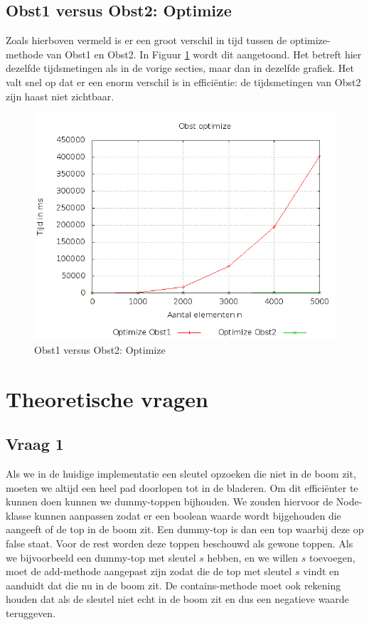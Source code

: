 \documentclass[titlepage,a4paper]{article}
\begin{document}
\subsection{Obst1 versus Obst2: Optimize}
Zoals hierboven vermeld is er een groot verschil in tijd tussen de optimize-methode van Obst1 en Obst2. In Figuur \ref{obst1_obst2_optimize} wordt dit aangetoond. Het betreft hier dezelfde tijdsmetingen als in de vorige secties, maar dan in dezelfde grafiek. Het valt snel op dat er een enorm verschil is in effici\"entie: de tijdsmetingen van Obst2 zijn haast niet zichtbaar.

\begin{figure}[here]
\includegraphics[width=0.9\linewidth]{../Resultaten/obst_optimize.png}
\caption{Obst1 versus Obst2: Optimize}
\label{obst1_obst2_optimize}
\end{figure}

\section{Theoretische vragen}
\subsection{Vraag 1}
Als we in de huidige implementatie een sleutel opzoeken die niet in de boom zit, moeten we altijd een heel pad doorlopen tot in de bladeren. Om dit effici\"enter te kunnen doen kunnen we dummy-toppen bijhouden. We zouden hiervoor de Node-klasse kunnen aanpassen zodat er een boolean waarde wordt bijgehouden die aangeeft of de top in de boom zit. Een dummy-top is dan een top waarbij deze op false staat. Voor de rest worden deze toppen beschouwd als gewone toppen. Als we bijvoorbeeld een dummy-top met sleutel $s$ hebben, en we willen $s$ toevoegen, moet de add-methode aangepast zijn zodat die de top met sleutel $s$ vindt en aanduidt dat die nu in de boom zit. De contains-methode moet ook rekening houden dat als de sleutel niet echt in de boom zit en dus een negatieve waarde teruggeven. 
\end{document}
